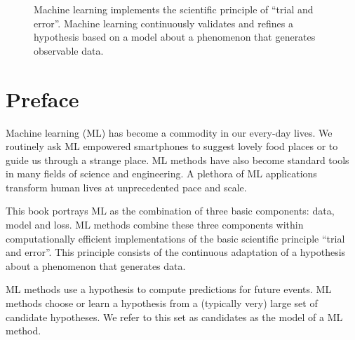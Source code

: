 \documentclass[12pt]{report}
\begin{document}
\begin{center}
\begin{figure}[htbp]
	\vspace*{-9mm}
	\caption{
		Machine learning implements the scientific principle of ``trial and error''. 
		Machine learning continuously validates and refines a hypothesis based on 
		a model about a phenomenon that generates observable data.}
	\label{fig_AlexMLBP}
\end{figure}
\end{center}



\newpage
\chapter*{Preface}

Machine learning (ML) has become a commodity in our every-day lives. 
We routinely ask ML empowered smartphones to suggest lovely food 
places or to guide us through a strange place. ML methods have also 
become standard tools in many fields of science and engineering. A 
plethora of ML applications transform human lives at unprecedented 
pace and scale. 

This book portrays ML as the combination of three basic components: 
data, model and loss. ML methods combine these three components 
within computationally efficient implementations of the basic scientific 
principle ``trial and error''. This principle consists of the continuous 
adaptation of a hypothesis about a phenomenon that generates data. 

ML methods use a hypothesis to compute predictions for future events. 
ML methods choose or learn a hypothesis from a (typically very) large set 
of candidate hypotheses. We refer to this set as candidates as the model 
of a ML method. 
\end{document}
